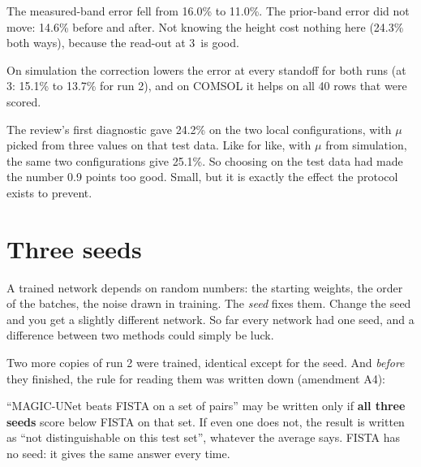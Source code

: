 \begin{keyidea}
The measured-band error fell from 16.0\% to 11.0\%. The prior-band error did not move: 14.6\% before and after. Not
knowing the height cost nothing here (24.3\% both ways), because the read-out at 3\um\ is good.
\end{keyidea}

On simulation the correction lowers the error at every standoff for both runs (at 3\um: 15.1\% to 13.7\% for run 2), and
on COMSOL it helps on all 40 rows that were scored.

\begin{careful}
The review's first diagnostic gave 24.2\% on the two local configurations, with $\mu$ picked from three values on that
test data. Like for like, with $\mu$ from simulation, the same two configurations give 25.1\%. So choosing on the test
data had made the number 0.9 points too good. Small, but it is exactly the effect the protocol exists to prevent.
\end{careful}

\section{Three seeds}

A trained network depends on random numbers: the starting weights, the order of the batches, the noise drawn in
training. The \emph{seed} fixes them. Change the seed and you get a slightly different network. So far every network had
one seed, and a difference between two methods could simply be luck.

Two more copies of run 2 were trained, identical except for the seed. And \emph{before} they finished, the rule for
reading them was written down (amendment A4):

\begin{keyidea}
``MAGIC-UNet beats FISTA on a set of pairs'' may be written only if \textbf{all three seeds} score below FISTA on that
set. If even one does not, the result is written as ``not distinguishable on this test set'', whatever the average
says. FISTA has no seed: it gives the same answer every time.
\end{keyidea}

